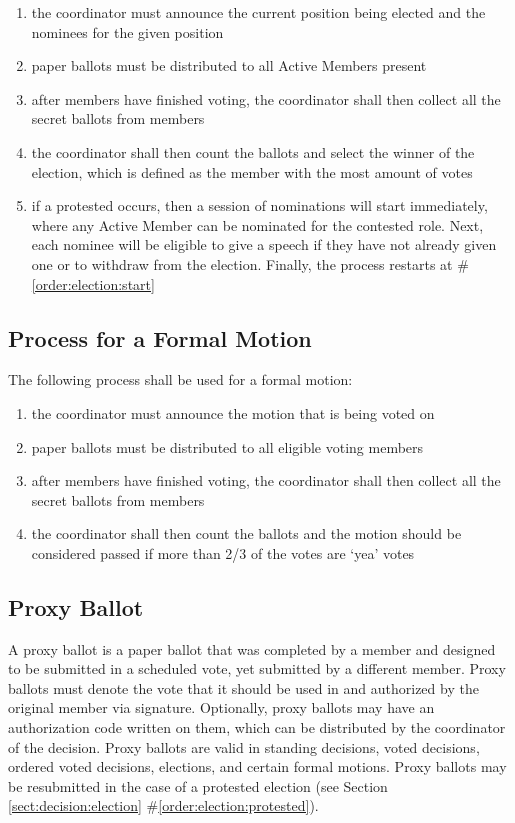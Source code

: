 \documentclass[english,11pt]{article}
\begin{document}
\begin{enumerate}
    \item \label{order:election:start} the coordinator must announce the current position being elected and the nominees for the given position
    \item paper ballots must be distributed to all Active Members present
    \item after members have finished voting, the coordinator shall then collect all the secret ballots from members
    \item the coordinator shall then count the ballots and select the winner of the election, which is defined as the member with the most amount of votes
    \item \label{order:election:protested} if a protested occurs, then a session of nominations will start immediately, where any Active Member can be nominated for the contested role.
        Next, each nominee will be eligible to give a speech if they have not already given one or to withdraw from the election.
        Finally, the process restarts at \#\ref{order:election:start}
\end{enumerate}

\subsection{Process for a Formal Motion} \label{sect:decision:formal-motion}
The following process shall be used for a formal motion:

\begin{enumerate}
    \item the coordinator must announce the motion that is being voted on
    \item paper ballots must be distributed to all eligible voting members
    \item after members have finished voting, the coordinator shall then collect all the secret ballots from members
    \item the coordinator shall then count the ballots and the motion should be considered passed if more than 2/3 of the votes are `yea' votes
\end{enumerate}

\subsection{Proxy Ballot} \label{sect:decision:proxy}
A proxy ballot is a paper ballot that was completed by a member and designed to be submitted in a scheduled vote, yet submitted by a different member.
Proxy ballots must denote the vote that it should be used in and authorized by the original member via signature.
Optionally, proxy ballots may have an authorization code written on them, which can be distributed by the coordinator of the decision.
Proxy ballots are valid in standing decisions, voted decisions, ordered voted decisions, elections, and certain formal motions.
Proxy ballots may be resubmitted in the case of a protested election (see Section \ref{sect:decision:election} \#\ref{order:election:protested}).
\end{document}
